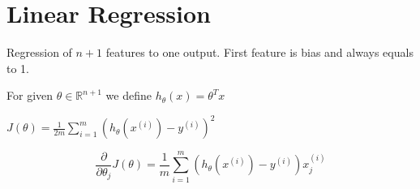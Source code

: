 \section{Linear Regression}
Regression of $n+1$ features to one output. First feature is bias and always equals to 1. 
\begin{definition}[hypothesis]
    For given $\theta \in \mathbb{R}^{n+1}$ we define $h_\theta(x) = \theta^T x$
\end{definition}

\begin{definition}
    $J(\theta) = \tfrac{1}{2m}\sum\limits_{i=1}^{m}(h_\theta(x^{(i)}) - y^{(i)})^2$
\end{definition}

\begin{definition}
    \begin{equation*}
        \frac{\partial}{\partial \theta_j} J(\theta) = \frac{1}{m} \sum\limits_{i=1}^{m} (h_\theta(x^{(i)}) - y^{(i)})x^{(i)}_j
    \end{equation*}
\end{definition}